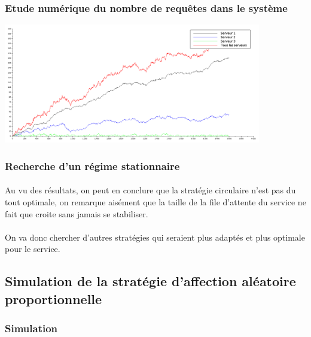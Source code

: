 \documentclass{article}
\begin{document}
\subsubsection{Etude numérique du nombre de requêtes dans le système}

\begin{center}
	\includegraphics[width=425px]{img/tls.png}
\end{center}

\subsubsection{Recherche d'un régime stationnaire}

\paragraph{}
Au vu des résultats, on peut en conclure que la stratégie circulaire n'est pas du tout optimale, on remarque aisément que la taille de la file d'attente du service ne fait que croite sans jamais se stabiliser.
\paragraph{}
On va donc chercher d'autres stratégies qui seraient plus adaptés et plus optimale pour le service.

\subsection{Simulation de la stratégie d'affection aléatoire proportionnelle}
\subsubsection{Simulation}
\end{document}
